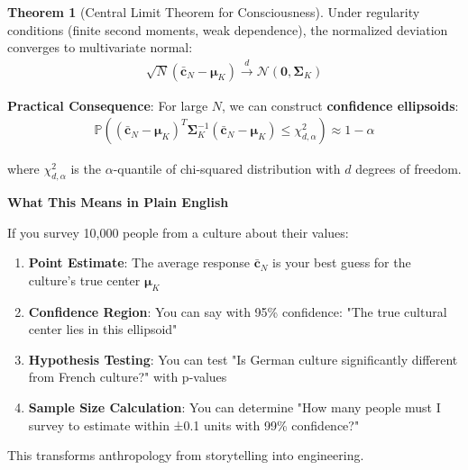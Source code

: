 \documentclass[11pt,a4paper]{article}
\theoremstyle{definition}
\newtheorem{theorem}{Theorem}[section]
\theoremstyle{remark}
\newcommand{\cc}{\mathbf{c}}
\begin{document}
\begin{small}
\begin{theorem}[Central Limit Theorem for Consciousness]
Under regularity conditions (finite second moments, weak dependence), the normalized deviation converges to multivariate normal:
\begin{align}
\sqrt{N}(\bar{\cc}_N - \boldsymbol{\mu}_K) \xrightarrow{d} \mathcal{N}(\mathbf{0}, \boldsymbol{\Sigma}_K)
\end{align}

\textbf{Practical Consequence}: For large \(N\), we can construct \textbf{confidence ellipsoids}:
\begin{align}
\mathbb{P}\left((\bar{\cc}_N - \boldsymbol{\mu}_K)^T \boldsymbol{\Sigma}_K^{-1} (\bar{\cc}_N - \boldsymbol{\mu}_K) \leq \chi^2_{d,\alpha}\right) \approx 1 - \alpha
\end{align}

where \(\chi^2_{d,\alpha}\) is the \(\alpha\)-quantile of chi-squared distribution with \(d\) degrees of freedom.
\end{theorem}

\begin{mdframed}[backgroundcolor=cyan!10,linewidth=2pt]
\textbf{What This Means in Plain English}

If you survey 10,000 people from a culture about their values:

\begin{enumerate}
    \item \textbf{Point Estimate}: The average response \(\bar{\cc}_N\) is your best guess for the culture's true center \(\boldsymbol{\mu}_K\)
    
    \item \textbf{Confidence Region}: You can say with 95\% confidence: "The true cultural center lies in this ellipsoid"
    
    \item \textbf{Hypothesis Testing}: You can test "Is German culture significantly different from French culture?" with p-values
    
    \item \textbf{Sample Size Calculation}: You can determine "How many people must I survey to estimate within ±0.1 units with 99\% confidence?"
\end{enumerate}

This transforms anthropology from storytelling into engineering.
\end{mdframed}


\end{small}
\end{document}
